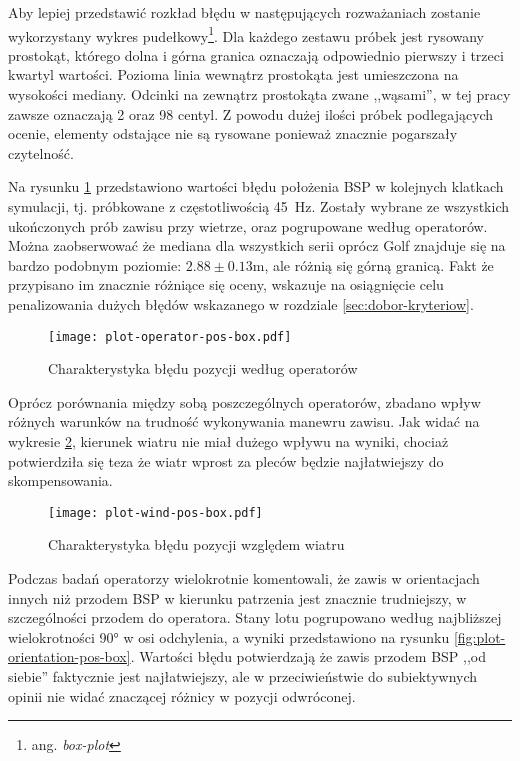 Aby lepiej przedstawić rozkład błędu w następujących rozważaniach zostanie wykorzystany wykres pudełkowy\footnote{ang. \emph{box-plot}}. Dla każdego zestawu próbek jest rysowany prostokąt, którego dolna i górna granica oznaczają odpowiednio pierwszy i trzeci kwartyl wartości. Pozioma linia wewnątrz prostokąta jest umieszczona na wysokości mediany. Odcinki na zewnątrz prostokąta zwane ,,wąsami'', w tej pracy zawsze oznaczają 2 oraz 98 centyl. Z powodu dużej ilości próbek podlegających ocenie, elementy odstające nie są rysowane ponieważ znacznie pogarszały czytelność.

Na rysunku \ref{fig:plot-operator-pos-box} przedstawiono wartości błędu położenia BSP w kolejnych klatkach symulacji, tj. próbkowane z częstotliwością 45~Hz. Zostały wybrane ze wszystkich ukończonych prób zawisu przy wietrze, oraz pogrupowane według operatorów. Można zaobserwować że mediana dla wszystkich serii oprócz Golf znajduje się na bardzo podobnym poziomie: $ 2.88 \pm 0.13 \text{m} $, ale różnią się górną granicą. Fakt że przypisano im znacznie różniące się oceny, wskazuje na osiągnięcie celu penalizowania dużych błędów wskazanego w rozdziale \ref{sec:dobor-kryteriow}.

\begin{figure}[!h]
    \centering \texttt{[image: plot-operator-pos-box.pdf]}
    \caption{Charakterystyka błędu pozycji według operatorów}
    \label{fig:plot-operator-pos-box}
\end{figure}

Oprócz porównania między sobą poszczególnych operatorów, zbadano wpływ różnych warunków na trudność wykonywania manewru zawisu. Jak widać na wykresie \ref{fig:plot-wind-pos-box}, kierunek wiatru nie miał dużego wpływu na wyniki, chociaż potwierdziła się teza że wiatr wprost za pleców będzie najłatwiejszy do skompensowania.

\begin{figure}[!h]
    \centering \texttt{[image: plot-wind-pos-box.pdf]}
    \caption{Charakterystyka błędu pozycji względem wiatru}
    \label{fig:plot-wind-pos-box}
\end{figure}

Podczas badań operatorzy wielokrotnie komentowali, że zawis w orientacjach innych niż przodem BSP w kierunku patrzenia jest znacznie trudniejszy, w szczególności przodem do operatora. Stany lotu pogrupowano według najbliższej wielokrotności 90° w osi odchylenia, a wyniki przedstawiono na rysunku \ref{fig:plot-orientation-pos-box}. Wartości błędu potwierdzają że zawis przodem BSP ,,od siebie'' faktycznie jest najłatwiejszy, ale w przeciwieństwie do subiektywnych opinii nie widać znaczącej różnicy w pozycji odwróconej.

